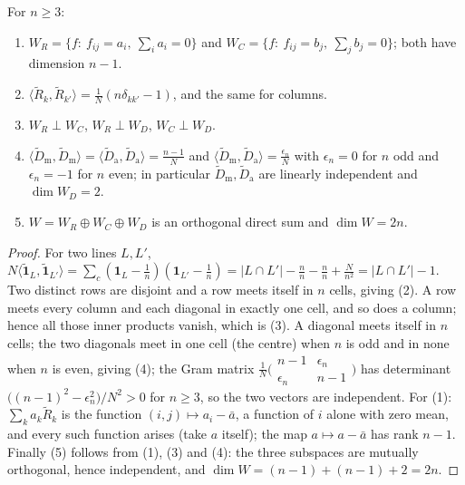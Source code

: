\begin{lemma}[Structure of $W$]
\label{lem:W_structure}
For $n\ge 3$:
\begin{enumerate}
\item $W_R=\{f:\ f_{ij}=a_i,\ \sum_i a_i=0\}$ and $W_C=\{f:\ f_{ij}=b_j,\ \sum_j b_j=0\}$; both have dimension $n-1$.
\item $\langle\tilde R_k,\tilde R_{k'}\rangle=\frac1N(n\delta_{kk'}-1)$, and the same for columns.
\item $W_R\perp W_C$, $W_R\perp W_D$, $W_C\perp W_D$.
\item $\langle\tilde D_{\mathrm m},\tilde D_{\mathrm m}\rangle=\langle\tilde D_{\mathrm a},\tilde D_{\mathrm a}\rangle=\frac{n-1}{N}$ and
$\langle\tilde D_{\mathrm m},\tilde D_{\mathrm a}\rangle=\frac{\epsilon_n}{N}$ with $\epsilon_n=0$ for $n$ odd and
$\epsilon_n=-1$ for $n$ even; in particular $\tilde D_{\mathrm m},\tilde D_{\mathrm a}$ are linearly independent and $\dim W_D=2$.
\item $W=W_R\oplus W_C\oplus W_D$ is an orthogonal direct sum and $\dim W=2n$.
\end{enumerate}
\end{lemma}

\begin{proof}
For two lines $L,L'$, $N\langle\tilde{\mathbf 1}_L,\tilde{\mathbf 1}_{L'}\rangle
=\sum_c(\mathbf 1_L-\tfrac1n)(\mathbf 1_{L'}-\tfrac1n)=|L\cap L'|-\tfrac{n}{n}-\tfrac{n}{n}+\tfrac{N}{n^{2}}=|L\cap L'|-1$.
Two distinct rows are disjoint and a row meets itself in $n$ cells, giving (2).  A row meets every column
and each diagonal in exactly one cell, and so does a column; hence all those inner products vanish, which
is (3).  A diagonal meets itself in $n$ cells; the two diagonals meet in one cell (the centre) when $n$ is
odd and in none when $n$ is even, giving (4); the Gram matrix $\frac1N\bigl(\begin{smallmatrix}n-1&\epsilon_n\\ \epsilon_n&n-1\end{smallmatrix}\bigr)$
has determinant $\bigl((n-1)^{2}-\epsilon_n^{2}\bigr)/N^{2}>0$ for $n\ge3$, so the two vectors are independent.
For (1): $\sum_k a_k\tilde R_k$ is the function $(i,j)\mapsto a_i-\bar a$, a function of $i$ alone with
zero mean, and every such function arises (take $a$ itself); the map $a\mapsto a-\bar a$ has rank $n-1$.
Finally (5) follows from (1), (3) and (4): the three subspaces are mutually orthogonal, hence independent,
and $\dim W=(n-1)+(n-1)+2=2n$.
\end{proof}

